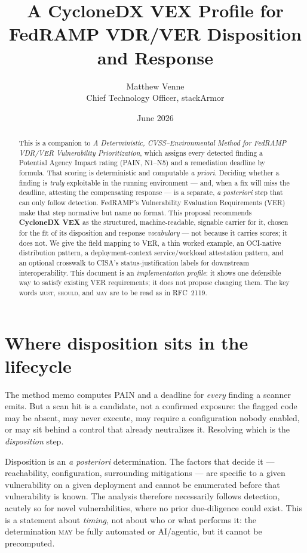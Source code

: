 \documentclass[11pt]{article}
\title{\bfseries A CycloneDX VEX Profile for\\ FedRAMP VDR/VER Disposition and Response}
\author{Matthew Venne \\ \small Chief Technology Officer, stackArmor}
\date{June 2026}
\newcommand{\rfckw}[1]{\textsc{#1}}
\begin{document}
\maketitle

\begin{abstract}
\noindent
This is a companion to \emph{A Deterministic, CVSS--Environmental Method for FedRAMP
VDR/VER Vulnerability Prioritization}, which assigns every detected finding a
Potential Agency Impact rating (PAIN, N1--N5) and a remediation deadline by formula.
That scoring is deterministic and computable \emph{a priori}. Deciding whether a
finding is \emph{truly} exploitable in the running environment --- and, when a fix will
miss the deadline, attesting the compensating response --- is a separate,
\emph{a posteriori} step that can only follow detection. FedRAMP's Vulnerability
Evaluation Requirements (VER) make that step normative but name no format. This
proposal recommends \textbf{CycloneDX VEX} as the structured, machine-readable, signable
carrier for it, chosen for the fit of its disposition and response \emph{vocabulary} ---
not because it carries scores; it does not. We give the field mapping to VER, a thin
worked example, an OCI-native distribution pattern, a deployment-context service/workload
attestation pattern, and an optional crosswalk to CISA's status-justification labels for
downstream interoperability. This document is an
\emph{implementation profile}: it shows one defensible way to satisfy existing VER
requirements; it does not propose changing them. The key words \rfckw{must},
\rfckw{should}, and \rfckw{may} are to be read as in RFC~2119.
\end{abstract}

\section{Where disposition sits in the lifecycle}
The method memo computes PAIN and a deadline for \emph{every} finding a scanner emits.
But a scan hit is a candidate, not a confirmed exposure: the flagged code may be
absent, may never execute, may require a configuration nobody enabled, or may sit
behind a control that already neutralizes it. Resolving which is the \emph{disposition}
step.

Disposition is an \emph{a posteriori} determination. The factors that decide it ---
reachability, configuration, surrounding mitigations --- are specific to a given
vulnerability on a given deployment and cannot be enumerated before that vulnerability
is known. The analysis therefore necessarily follows detection, acutely so for novel
vulnerabilities, where no prior due-diligence could exist. This is a statement about
\emph{timing}, not about who or what performs it: the determination \rfckw{may} be fully
automated or AI/agentic, but it cannot be precomputed.
\end{document}
